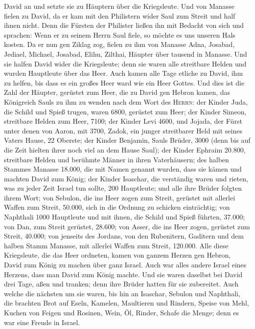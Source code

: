 David an und setzte sie zu Häuptern über die Kriegsleute.
 Und von Manasse fielen zu David, da er kam mit den
Philistern wider Saul zum Streit und half ihnen nicht. Denn die Fürsten
der Philister ließen ihn mit Bedacht von sich und sprachen: Wenn er zu
seinem Herrn Saul fiele, so möchte es uns unseren Hals kosten.
 Da er nun gen Ziklag zog, fielen zu ihm von Manasse
Adna, Josabad, Jediael, Michael, Josabad, Elihu, Zilthai, Häupter über
tausend in Manasse.  Und sie halfen David wider die
Kriegsleute; denn sie waren alle streitbare Helden und wurden Hauptleute
über das Heer.  Auch kamen alle Tage etliche zu David,
ihm zu helfen, bis dass es ein großes Heer ward wie ein Heer Gottes.
 Und dies ist die Zahl der Häupter, gerüstet zum Heer,
die zu David gen Hebron kamen, das Königreich Sauls zu ihm zu wenden
nach dem Wort des \textsc{Herrn}:  der Kinder Juda, die
Schild und Spieß trugen, waren 6800, gerüstet zum Heer; 
der Kinder Simeon, streitbare Helden zum Heer, 7100;  der
Kinder Levi 4600,  und Jojada, der Fürst unter denen von
Aaron, mit 3700,  Zadok, ein junger streitbarer Held mit
seines Vaters Hause, 22 Oberste;  der Kinder Benjamin,
Sauls Brüder, 3000 (denn bis auf die Zeit hielten ihrer noch viel an dem
Hause Saul);  der Kinder Ephraim 20.800, streitbare
Helden und berühmte Männer in ihren Vaterhäusern;  des
halben Stammes Manasse 18.000, die mit Namen genannt wurden, dass sie
kämen und machten David zum König;  der Kinder Isaschar,
die verständig waren und rieten, was zu jeder Zeit Israel tun sollte,
200 Hauptleute; und alle ihre Brüder folgten ihrem Wort; 
von Sebulon, die ins Heer zogen zum Streit, gerüstet mit allerlei Waffen
zum Streit, 50.000, sich in die Ordnung zu schicken einträchtig;
 von Naphthali 1000 Hauptleute und mit ihnen, die Schild
und Spieß führten, 37.000;  von Dan, zum Streit gerüstet,
28.600;  von Asser, die ins Heer zogen, gerüstet zum
Streit, 40.000;  von jenseits des Jordans, von den
Rubenitern, Gaditern und dem halben Stamm Manasse, mit allerlei Waffen
zum Streit, 120.000.  Alle diese Kriegsleute, die das
Heer ordneten, kamen von ganzem Herzen gen Hebron, David zum König zu
machen über ganz Israel. Auch war alles andere Israel eines Herzens,
dass man David zum König machte.  Und sie waren daselbst
bei David drei Tage, aßen und tranken; denn ihre Brüder hatten für sie
zubereitet.  Auch welche die nächsten um sie waren, bis
hin an Isaschar, Sebulon und Naphthali, die brachten Brot auf Eseln,
Kamelen, Maultieren und Rindern, Speise von Mehl, Kuchen von Feigen und
Rosinen, Wein, Öl, Rinder, Schafe die Menge; denn es war eine Freude in
Israel.

